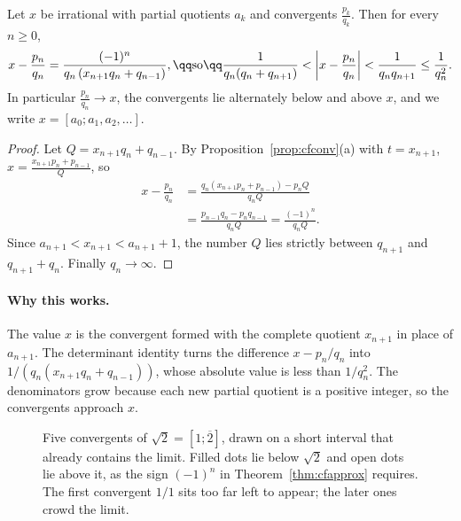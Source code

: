 \begin{theorem}\label{thm:cfapprox}
Let $x$ be irrational with partial quotients $a_k$ and convergents $\frac{p_k}{q_k}$. Then for every $n\ge0$,
\[
\begin{gathered}x-\frac{p_n}{q_n}=\frac{(-1)^n}{q_n\left(x_{n+1}q_n+q_{n-1}\right)},\qq\text{so}\qq\frac1{q_n(q_n+q_{n+1})}<\left|x-\frac{p_n}{q_n}\right|<\frac1{q_nq_{n+1}}\le\frac1{q_n^2}.\end{gathered}
\]
In particular $\frac{p_n}{q_n}\to x$, the convergents lie alternately below and above $x$, and we write $x=[a_0;a_1,a_2,\dots]$.
\end{theorem}
\begin{proof}
Let $Q=x_{n+1}q_n+q_{n-1}$. By Proposition~\ref{prop:cfconv}(a) with $t=x_{n+1}$, $x=\frac{x_{n+1}p_n+p_{n-1}}Q$, so
\[
\begin{aligned}x-\frac{p_n}{q_n}&=\frac{q_n(x_{n+1}p_n+p_{n-1})-p_nQ}{q_nQ}\\&=\frac{p_{n-1}q_n-p_nq_{n-1}}{q_nQ}=\frac{(-1)^n}{q_nQ}.\end{aligned}
\]
Since $a_{n+1}<x_{n+1}<a_{n+1}+1$, the number $Q$ lies strictly between $q_{n+1}$ and $q_{n+1}+q_n$. Finally $q_n\to\infty$.
\end{proof}

\paragraph{Why this works.}
The value $x$ is the convergent formed with the complete quotient $x_{n+1}$ in place of $a_{n+1}$. The determinant identity turns the difference $x-p_n/q_n$ into $1/(q_n(x_{n+1}q_n+q_{n-1}))$, whose absolute value is less than $1/q_n^2$. The denominators grow because each new partial quotient is a positive integer, so the convergents approach $x$.

\begin{figure}[ht]
\centering
{}
\caption{Five convergents of $\sqrt2=[1;\overline{2}]$, drawn on a short interval that already contains the limit. Filled dots lie below $\sqrt2$ and open dots lie above it, as the sign $(-1)^n$ in Theorem~\ref{thm:cfapprox} requires. The first convergent $1/1$ sits too far left to appear; the later ones crowd the limit.}
\label{fig:cf-line}
\end{figure}

